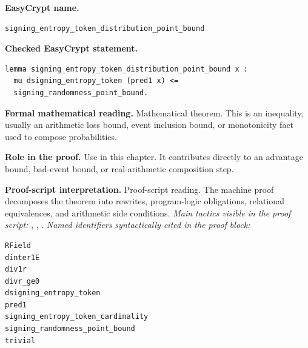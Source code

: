 \begin{formaltheorem}
\noindent\textbf{EasyCrypt name.}
\begin{lstlisting}[language=EasyCrypt,basicstyle=\ttfamily\scriptsize]
signing_entropy_token_distribution_point_bound
\end{lstlisting}
\noindent\textbf{Checked EasyCrypt statement.}
\begin{lstlisting}[language=EasyCrypt,basicstyle=\ttfamily\scriptsize]
lemma signing_entropy_token_distribution_point_bound x :
  mu dsigning_entropy_token (pred1 x) <=
  signing_randomness_point_bound.
\end{lstlisting}
\noindent\textbf{Formal mathematical reading.}
Mathematical theorem. This is an inequality, usually an arithmetic loss bound, event inclusion bound, or monotonicity fact used to compose probabilities.

\noindent\textbf{Role in the proof.}
Use in this chapter. It contributes directly to an advantage bound, bad-event bound, or real-arithmetic composition step.

\noindent\textbf{Proof-script interpretation.}
Proof-script reading. The machine proof decomposes the theorem into rewrites, program-logic obligations, relational equivalences, and arithmetic side conditions.
\emph{Main tactics visible in the proof script:} , , .
\emph{Named identifiers syntactically cited in the proof block:}
\begin{lstlisting}[language=EasyCrypt,basicstyle=\ttfamily\scriptsize]
RField
dinter1E
div1r
divr_ge0
dsigning_entropy_token
pred1
signing_entropy_token_cardinality
signing_randomness_point_bound
trivial
\end{lstlisting}

\end{formaltheorem}

